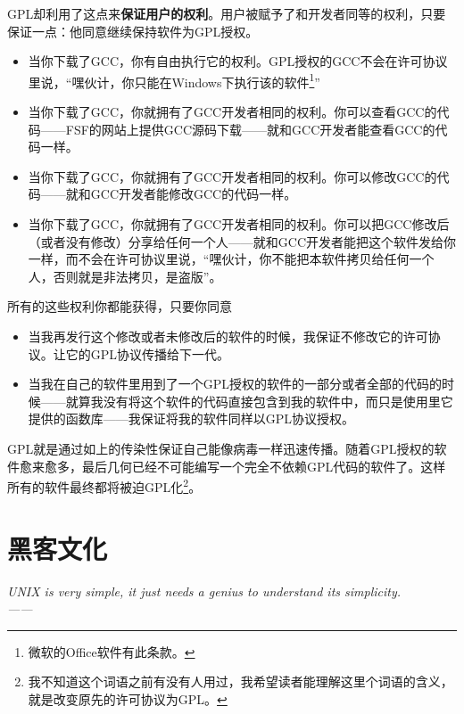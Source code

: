 \documentclass[amstex]{ctexbook}
\newenvironment{quotes}[1]{\pushQED{#1}%
\begin{flushright}%
\begin{minipage}{0.5\textwidth}\begin{flushright}\noindent\it}{%
 \\------\popQED{}\end{flushright}\end{minipage}\end{flushright}}%
\begin{document}
GPL却利用了这点来\textbf{保证用户的权利}。用户被赋予了和开发者同等的权利，只要保证一点：他同意继续保持软件为GPL授权。

\begin{itemize}
\item 当你下载了GCC，你有自由执行它的权利。GPL授权的GCC不会在许可协议里说，“嘿伙计，你只能在Windows下执行该的软件\footnote{微软的Office软件有此条款。}”

\item 当你下载了GCC，你就拥有了GCC开发者相同的权利。你可以查看GCC的代码------FSF的网站上提供GCC源码下载------就和GCC开发者能查看GCC的代码一样。

\item  当你下载了GCC，你就拥有了GCC开发者相同的权利。你可以修改GCC的代码------就和GCC开发者能修改GCC的代码一样。

\item  当你下载了GCC，你就拥有了GCC开发者相同的权利。你可以把GCC修改后（或者没有修改）分享给任何一个人------就和GCC开发者能把这个软件发给你一样，而不会在许可协议里说，“嘿伙计，你不能把本软件拷贝给任何一个人，否则就是非法拷贝，是盗版”。

\end{itemize}

所有的这些权利你都能获得，只要你同意
\begin{itemize}
\item 当我再发行这个修改或者未修改后的软件的时候，我保证不修改它的许可协议。让它的GPL协议传播给下一代。
\item 当我在自己的软件里用到了一个GPL授权的软件的一部分或者全部的代码的时候------就算我没有将这个软件的代码直接包含到我的软件中，而只是使用里它提供的函数库------我保证将我的软件同样以GPL协议授权。
\end{itemize}

GPL就是通过如上的传染性保证自己能像病毒一样迅速传播。随着GPL授权的软件愈来愈多，最后几何已经不可能编写一个完全不依赖GPL代码的软件了。这样所有的软件最终都将被迫GPL化\footnote{我不知道这个词语之前有没有人用过，我希望读者能理解这里个词语的含义，就是改变原先的许可协议为GPL。}。



\chapter{黑客文化}
\begin{quotes}{Dennis Ritchie}
UNIX is very simple, it just needs a genius to understand its simplicity.
\end{quotes}
\end{document}
